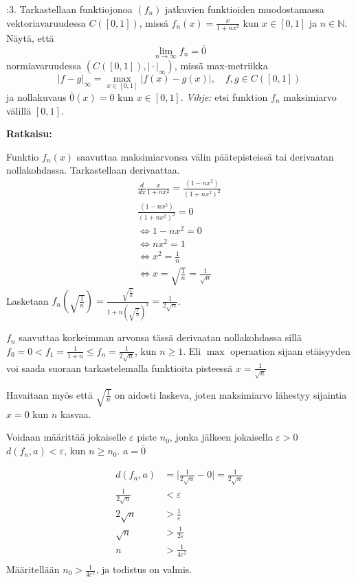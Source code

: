 \documentclass[12pt,a4paper,leqno]{amsart}
\begin{document}
\bigskip

:3.   Tarkastellaan funktiojonoa $(f_n)$ jatkuvien funktioiden muodostamassa vektoriavaruudessa $C([0,1])$, 
missä $f_n(x) = \frac{x}{1+nx^2}$ kun $x \in [0,1]$ ja $n \in \mathbb N$. Näytä, että 
\[
\lim_{n\to\infty} f_n = \overline{0}
\]
normiavaruudessa $(C([0,1]),\vert \cdot \vert_{\infty})$, missä 
max-metriikka  
\[
\vert f-g \vert_\infty = \max_{x\in [0,1]} \vert f(x) - g(x)\vert, \quad f, g \in C([0,1])
\]
ja nollakuvaus $\overline{0}(x) = 0$ kun $x \in [0,1]$.
\textit{Vihje:} etsi  funktion $f_n$ maksimiarvo välillä $[0,1]$.

\textbf{Ratkaisu: }

Funktio $f_n (x)$ saavuttaa maksimiarvonsa välin päätepisteissä tai derivaatan nollakohdassa. Tarkastellaan derivaattaa.
\begin{align*}
    \frac{d}{dx} \frac{x}{1+nx^2} = \frac{(1 - n x^2)}{(1 + n x^2)^2} \\
    \frac{(1 - n x^2)}{(1 + n x^2)^2} = 0 \\
    \iff 1 - n x^2 = 0 \\
    \iff n x^2 = 1 \\
    \iff x^2 = \frac{1}{n} \\
    \iff x = \sqrt{\frac{1}{n}} = \frac{1}{\sqrt{n}}
\end{align*}
Lasketaan $f_n(\sqrt{\frac{1}{n}}) = \frac{\sqrt{\frac{1}{n}}}{1+n(\sqrt{\frac{1}{n}})^2} = \frac{1}{2 \sqrt{n}}$. 

$f_n$ saavuttaa korkeimman arvonsa tässä derivaatan nollakohdassa sillä $f_0 = 0 < f_1 = \frac{1}{1+n} \leq f_n = \frac{1}{2 \sqrt{n}}$, kun $n \geq 1$. Eli $\max$ operaation sijaan etäisyyden voi saada suoraan tarkastelemalla funktioita pisteessä $x = \frac{1}{\sqrt{n}}$

Havaitaan myös että $\sqrt{\frac{1}{n}}$ on aidosti laskeva, joten maksimiarvo lähestyy sijaintia $x=0$ kun $n$ kasvaa.

Voidaan määrittää jokaiselle $\varepsilon$ piste $n_0$, jonka jälkeen jokaisella $\varepsilon > 0$ $d(f_n, a) < \varepsilon$, kun $n \geq n_0$. $a = \overline{0}$

\begin{align*}
    d(f_n, a) &= \vert \frac{1}{2 \sqrt{n}} - 0 \vert = \frac{1}{2 \sqrt{n}} \\
    \frac{1}{2 \sqrt{n}} &< \varepsilon \\
    2 \sqrt{n} &> \frac{1}{\varepsilon} \\
    \sqrt{n} &> \frac{1}{2\varepsilon} \\
    n &> \frac{1}{4\varepsilon^2} \\
\end{align*}
Määritellään $n_0 > \frac{1}{4 \varepsilon^2}$, ja todistus on valmis. 
\end{document}
